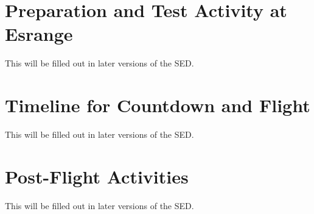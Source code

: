 \documentclass[
  a4paper,
  11pt,
  openany,
  parskip,
  toc=totoc,
  listof=totoc,
  bibliography=totoc
]{scrreprt}
\begin{document}
\section{Preparation and Test Activity at Esrange}
\label{sec:ESRANGE_activity}

This will be filled out in later versions of the SED.


\clearpage


\section{Timeline for Countdown and Flight}
\label{sec:timeline}

This will be filled out in later versions of the SED.

\clearpage



\section{Post-Flight Activities}

This will be filled out in later versions of the SED.

\end{document}
